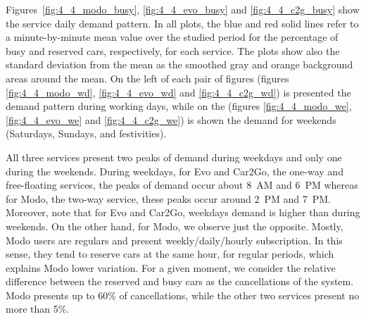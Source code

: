 Figures~\ref{fig:4_4_modo_busy}, \ref{fig:4_4_evo_busy} and \ref{fig:4_4_c2g_busy} show the service daily demand pattern. In all plots, the blue and red solid lines refer to a minute-by-minute mean value over the studied period for the percentage of busy and reserved cars, respectively, for each service. The plots show also the standard deviation from the mean as the smoothed gray and orange background areas around the mean. On the left of each pair of figures (figures \ref{fig:4_4_modo_wd}, \ref{fig:4_4_evo_wd} and \ref{fig:4_4_c2g_wd}) is presented the demand pattern during working days, while on the (figures \ref{fig:4_4_modo_we}, \ref{fig:4_4_evo_we} and \ref{fig:4_4_c2g_we}) is shown the demand for weekends (Saturdays, Sundays, and festivities). 


All three services present two peaks of demand during weekdays and only one during the weekends. During weekdays, for Evo and Car2Go, the one-way and free-floating services, the peaks of demand occur about 8~AM and 6~PM whereas for Modo, the two-way service, these peaks occur around 2~PM and 7~PM.
Moreover, note that for Evo and Car2Go, weekdays demand is higher than during weekends. On the other hand, for Modo, we observe just the opposite. 
Mostly, Modo users are regulars and present weekly/daily/hourly subscription. In this sense, they tend to reserve cars at the same hour, for regular periods, which explains Modo lower variation. For a given moment, we consider the relative difference between the reserved and busy cars as the cancellations of the system. Modo presents up to 60\% of cancellations, while the other two services present no more than 5\%. 



